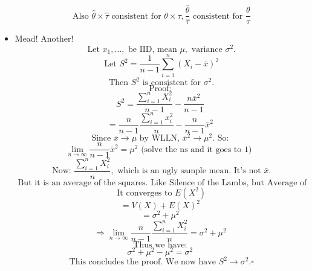\documentclass{article}
\begin{document}
\begin{itemize}
\[      \] 
      \[
        \text{ Also } \hat{\theta} \times \hat{\tau} \text{ consistent for } \theta \times \tau, \frac{ \hat{\theta}}{ \hat{\tau}} \text{ consistent for } \frac{\theta}{\tau}
      \]
    \item Mead! Another!
      \[
        \text{ Let } x_1, \ldots, \text{ be IID, mean } \mu, \text{ variance } \sigma^2.
      \] \[
      \text{ Let } S^2 = \frac{1}{n - 1} \sum_{i = 1}^{n} (X_i - \bar{x})^2
      \] \[
        \text{ Then } S^2 \text{ is consistent for } \sigma^2.
      \] \[
        \text{ Proof: }
      \] \[
        S^2 = \frac{ \sum_{i = 1}^{n} X_i^2}{n - 1} - \frac{n \bar{x}^2}{n - 1}
      \] \[
        = \frac{n}{n - 1} \frac{ \sum_{i = 1}^{n} x_i^2}{n} - \frac{n}{n - 1} \bar{x}^2
      \] 
      \[
        \text{ Since } \bar{x} \rightarrow \mu \text{ by WLLN, } \bar{x}^2 \rightarrow \mu^2. \text{ So: }
      \] 
      \[
        \lim_{n \to \infty} \frac{n}{n - 1} \bar{x}^2 = \mu^2 \text{ (solve the ns and it goes to 1) }
      \] 
      \[
        \text{ Now: } \frac{ \sum_{i = 1}^{n} X_i^2}{n}, \text{ which is an ugly sample mean. It's not } \bar{x}.
      \] \[
        \text{ But it is an average of the squares. Like Silence of the Lambs, but Average of the Squares }
      \] \[
      \text{ It converges to } E(X^2)
      \] \[
      = V(X) + E{(X)}^2
      \] \[
        = \sigma^2 + \mu^2
      \] 
      \[
        \Rightarrow \lim_{n \to \infty} \frac{n}{n - 1} \frac{ \sum_{i = 1}^{n} X_i^2}{n} = \sigma^2 + \mu^2
      \] 
      \[
        \text{ Thus we have: }
      \] \[
        \sigma^2 + \mu^2 - \mu^2 = \sigma^2
      \] 
      \[
        \text{ This concludes the proof. We now have } S^2 \rightarrow \sigma^2. \square
      \] 
  \end{itemize}
\end{document}
